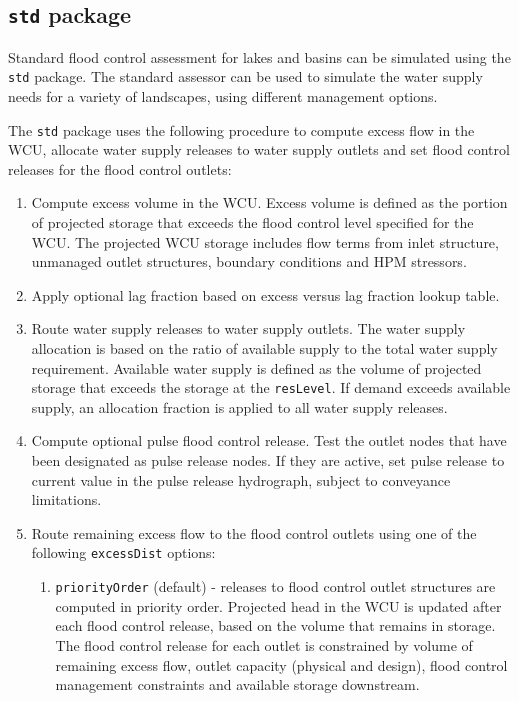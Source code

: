\subsection{{\tt std} package}\label{fcassessor:std}

Standard flood control assessment for lakes and basins can be
simulated using the {\tt std} package.  The standard assessor can be
used to simulate the water supply needs for a variety of landscapes,
using different management options.  

The {\tt std} package uses the following procedure to compute excess
flow in the WCU, allocate water supply releases to water supply
outlets and set flood control releases for the flood control outlets:

\begin{enumerate}

 \item Compute excess volume in the WCU.  Excess volume is defined as
   the portion of projected storage that exceeds the flood control
   level specified for the WCU.  The projected WCU storage includes
   flow terms from inlet structure, unmanaged outlet structures,
   boundary conditions and HPM stressors.

 \item Apply optional lag fraction based on excess versus lag fraction
   lookup table.

 \item Route water supply releases to water supply outlets.  The water
   supply allocation is based on the ratio of available supply to the
   total water supply requirement.  Available water supply is defined
   as the volume of projected storage that exceeds the storage at the
   {\tt resLevel}.  If demand exceeds available supply, an allocation
   fraction is applied to all water supply releases.  

 \item Compute optional pulse flood control release.  Test the outlet
   nodes that have been designated as pulse release nodes.  If they
   are active, set pulse release to current value in the pulse release
   hydrograph, subject to conveyance limitations.  

 \item Route remaining excess flow to the flood control outlets using
   one of the following {\tt excessDist} options:

 \begin{enumerate}
  
  \item {\tt priorityOrder} (default) \-- releases to flood control
    outlet structures are computed in priority order.  Projected head
    in the WCU is updated after each flood control release, based on
    the volume that remains in storage.  The flood control release for
    each outlet is constrained by volume of remaining excess flow,
    outlet capacity (physical and design), flood control management
    constraints and available storage downstream.


\end{enumerate}
\end{enumerate}
